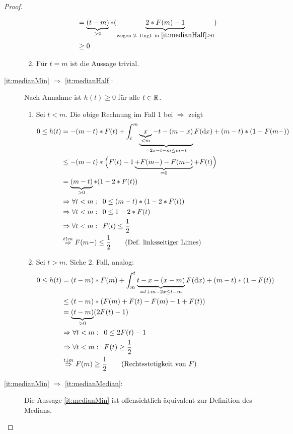 \begin{proof}
\begin{description}
\begin{enumerate}[label=Fall \Alph*:]
\begin{align*}
					&=\underbrace{(t-m)}_{> 0}*(\underbrace{2 * F(m)-1}_{\text{wegen 2.\ Ungl.\ in }\ref{it:medianHalf}\ge0})\\
					&\ge 0
				\end{align*}
			\item Für $t = m$ ist die Aussage trivial.
		\end{enumerate}
		\item[\ref{it:medianMin} $\Rightarrow$ \ref{it:medianHalf}:]
			Nach Annahme ist $h(t) \ge 0$ für alle $t \in \mathbb{R}$.
			\begin{enumerate}[label=Fall \Alph*:] 
				\item Sei $t<m$. Die obige Rechnung im Fall 1 bei $\Rightarrow$ zeigt
				\begin{align*}
					0 \le h(t)
					&= -(m-t) * F(t)+ \int_t^m \underbrace{\underbrace{x}_{<m}-t-(m-x) }_{=2x-t-m \le m-t} F(\mathrm{d}x)+(m-t) * (1-F(m-)) \\
					& \le -(m-t)* \Big( F(t)-1 \underbrace{+F(m-)-F(m-)}_{=0}+F(t) \Big) \\
					&=\underbrace{(m-t)}_{>0}*(1-2* F(t)) \\
					&\Rightarrow\forall t<m: \enskip 0 \le(m-t)*(1-2* F(t))\\
					&\Rightarrow\forall t<m: \enskip 0 \le 1-2* F(t)\\
					&\Rightarrow\forall t<m: \enskip F(t) \le \frac{1}{2}\\
					&\overset{t \uparrow m}{\Rightarrow} F(m-)\le\frac{1}{2} \tag{Def. linksseitiger Limes}
				\end{align*}
			\item Sei $t > m$. Siehe 2. Fall, analog:
			\begin{align*}
				0 \le h(t)
				&= (t-m)* F(m) + \int_m^t \underbrace{t - x - (x - m) }_{=t + m - 2x \le t-m} F(\mathrm{d}x) + (m-t)*(1-F(t)) \\
				&\le (t-m)*\left( F(m)+ F(t) - F(m)-1 + F(t) \right) \\
				&= \underbrace{(t-m)}_{>0}(2F(t) - 1) \\
				&\Rightarrow \forall t<m: \enskip 0\le 2F(t) - 1\\
				&\Rightarrow \forall t<m: \enskip F(t) \ge \frac{1}{2}\\
				&\overset{t\downarrow m}{\Rightarrow} F(m) \ge \frac{1}{2} \tag{Rechtsstetigkeit von $F$}
			\end{align*}
			\end{enumerate}
		\item[\ref{it:medianMin} $\Rightarrow$ \ref{it:medianMedian}:]
			Die Aussage \ref{it:medianMin} ist offensichtlich äquivalent zur Definition des Medians.
	\end{description}
\end{proof}

